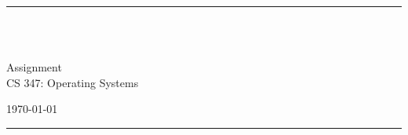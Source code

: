 \fancyhead[C]{}
\hrule \medskip
\begin{minipage}{0.295\textwidth} 
\raggedright
\footnotesize
\yourname \hfill\\ 
\yournetid \hfill\\ 
\youremail
\end{minipage}
\begin{minipage}{0.4\textwidth} 
\centering 
\large 
Assignment \assignmentnumber\\ 
\normalsize 
CS 347: Operating Systems\\ 
\end{minipage}
\begin{minipage}{0.295\textwidth} 
\raggedleft
\today\hfill\\
\end{minipage}
\medskip\hrule 
\bigskip
